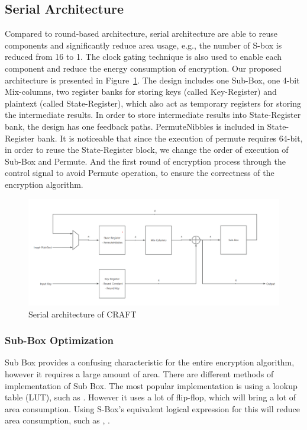 \documentclass[sn-basic]{sn-jnl}%
\begin{document}
\subsection{Serial Architecture}\label{subsec2}
Compared to round-based architecture, serial architecture are able to reuse components and significantly reduce area usage, e.g., the number of S-box is reduced from 16 to 1. 
The clock gating technique is also used to enable each component and reduce the energy consumption of encryption. Our proposed architecture is presented in Figure~\ref{fig3}. 
The design includes one Sub-Box, one 4-bit Mix-columns, two register banks for storing keys (called Key-Register) and plaintext (called State-Register), which also act as temporary registers for storing the intermediate results. 
In order to store intermediate results into State-Register bank, the design has one feedback paths. 
PermuteNibbles is included in State-Register bank. 
It is noticeable that since the execution of permute requires 64-bit, in order to reuse the State-Register block, we change the order of execution of Sub-Box and Permute. 
And the first round of encryption process through the control signal to avoid Permute operation, to ensure the correctness of the encryption algorithm.

\begin{figure}[h]%
    \centering
    \includegraphics[width=\textwidth]{serial_design.png}
    \caption{Serial architecture of CRAFT}\label{fig3}
\end{figure}


\subsubsection{Sub-Box Optimization }\label{subsubsec1}
Sub Box provides a confusing characteristic for the entire encryption algorithm, however it requires a large amount of area. 
There are different methods of implementation of Sub Box. 
The most popular implementation is using a lookup table (LUT), such as \cite{lara2017lightweight}. 
However it uses a lot of flip-flop, which will bring a lot of area consumption. 
Using S-Box's equivalent logical expression for this will reduce area consumption, such as \cite{bao2019peigen}, \cite{bib16}.
\end{document}
